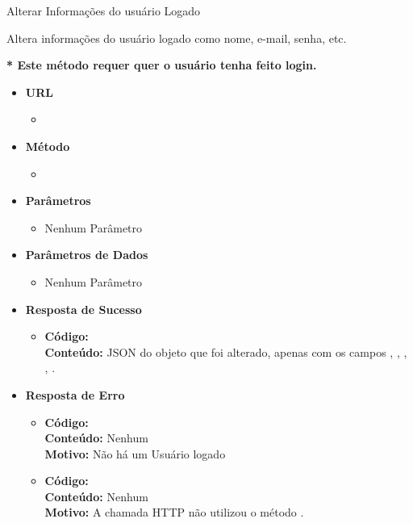 \begin{caixa}{Alterar Informações do usuário Logado}{}

Altera informações do usuário logado como nome, e-mail, senha, etc.

\textbf{* Este método requer quer o usuário tenha feito login.}

\begin{itemize}
\item \textbf{URL}
	\begin{itemize}
		\item {}
	\end{itemize}

\item \textbf{Método}
	\begin{itemize}
		\item {}
	\end{itemize}

\item \textbf{Parâmetros}
	\begin{itemize}
        \item Nenhum Parâmetro
	\end{itemize}

\item \textbf{Parâmetros de Dados}
	\begin{itemize}
		\item Nenhum Parâmetro
	\end{itemize}

\item \textbf{Resposta de Sucesso}
	\begin{itemize}
		\item \textbf{Código:}  \\ \textbf{Conteúdo:} JSON do objeto  que foi alterado, apenas com os campos , , , , .
	\end{itemize}

\item \textbf{Resposta de Erro}
	\begin{itemize}
		\item \textbf{Código:}  \\ \textbf{Conteúdo:} Nenhum \\ \textbf{Motivo:} Não há um Usuário logado
        \item \textbf{Código:}  \\ \textbf{Conteúdo:} Nenhum \\ \textbf{Motivo:} A chamada HTTP não utilizou o método .
	\end{itemize}

\end{itemize}
\end{caixa}

